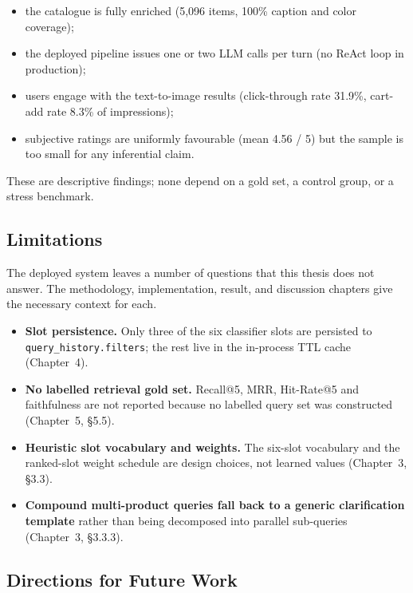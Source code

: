 \begin{itemize}
    \item the catalogue is fully enriched (5{,}096 items, 100\% caption and color coverage);
    \item the deployed pipeline issues one or two LLM calls per turn (no ReAct loop in production);
    \item users engage with the text-to-image results (click-through rate 31.9\%, cart-add rate 8.3\% of impressions);
    \item subjective ratings are uniformly favourable (mean 4.56 / 5) but the sample is too small for any inferential claim.
\end{itemize}

These are descriptive findings; none depend on a gold set, a control group, or a stress benchmark.

\subsection{Limitations}
\label{subsec:limitations}

The deployed system leaves a number of questions that this thesis does not answer. The methodology, implementation, result, and discussion chapters give the necessary context for each.

\begin{itemize}
    \item \textbf{Slot persistence.} Only three of the six classifier slots are persisted to \texttt{query\_history.filters}; the rest live in the in-process TTL cache (Chapter~4).
    \item \textbf{No labelled retrieval gold set.} Recall@5, MRR, Hit-Rate@5 and faithfulness are not reported because no labelled query set was constructed (Chapter~5, §5.5).
    \item \textbf{Heuristic slot vocabulary and weights.} The six-slot vocabulary and the ranked-slot weight schedule are design choices, not learned values (Chapter~3, §3.3).
    \item \textbf{Compound multi-product queries fall back to a generic clarification template} rather than being decomposed into parallel sub-queries (Chapter~3, §3.3.3).
\end{itemize}

\subsection{Directions for Future Work}
\label{subsec:future_work}

